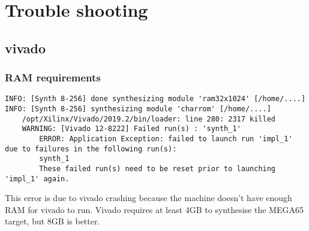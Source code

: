 \chapter{Trouble shooting}
    \section{vivado}
    \subsection{RAM requirements}
    \begin{tcolorbox}[colback=black,coltext=white]
    \verbatimfont{\codefont}
    \begin{verbatim}
INFO: [Synth 8-256] done synthesizing module 'ram32x1024' [/home/....]
INFO: [Synth 8-256] synthesizing module 'charrom' [/home/....]
    /opt/Xilinx/Vivado/2019.2/bin/loader: line 280: 2317 killed
    WARNING: [Vivado 12-8222] Failed run(s) : 'synth_1'
        ERROR: Application Exception: failed to launch run 'impl_1' due to failures in the following run(s):
        synth_1
        These failed run(s) need to be reset prior to launching 'impl_1' again.
    \end{verbatim}
    \end{tcolorbox}
This error is due to vivado crashing because the machine doesn't have enough RAM for vivado to run.
Vivado requires at least 4GB to synthesise the MEGA65 target, but 8GB is better.

